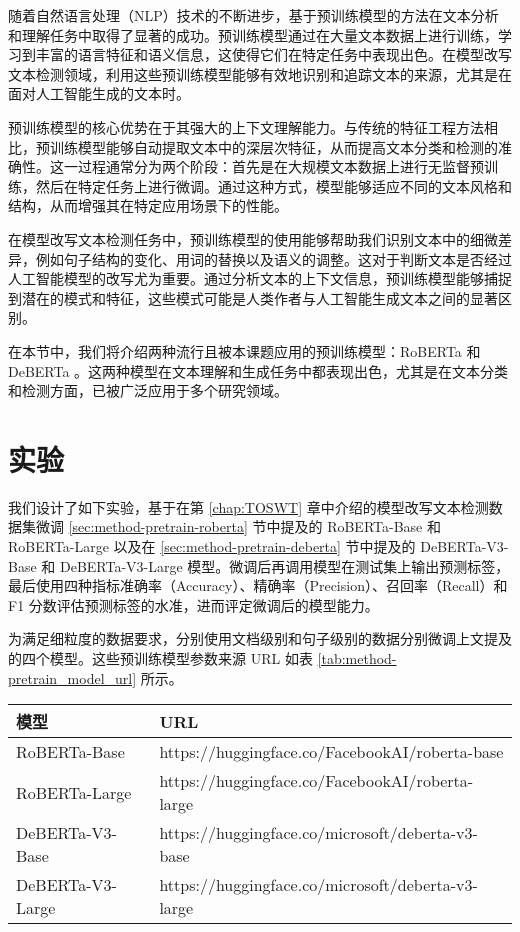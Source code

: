 随着自然语言处理（NLP）技术的不断进步，基于预训练模型的方法在文本分析和理解任务中取得了显著的成功。预训练模型通过在大量文本数据上进行训练，学习到丰富的语言特征和语义信息，这使得它们在特定任务中表现出色。在模型改写文本检测领域，利用这些预训练模型能够有效地识别和追踪文本的来源，尤其是在面对人工智能生成的文本时。

预训练模型的核心优势在于其强大的上下文理解能力。与传统的特征工程方法相比，预训练模型能够自动提取文本中的深层次特征，从而提高文本分类和检测的准确性。这一过程通常分为两个阶段：首先是在大规模文本数据上进行无监督预训练，然后在特定任务上进行微调。通过这种方式，模型能够适应不同的文本风格和结构，从而增强其在特定应用场景下的性能。

在模型改写文本检测任务中，预训练模型的使用能够帮助我们识别文本中的细微差异，例如句子结构的变化、用词的替换以及语义的调整。这对于判断文本是否经过人工智能模型的改写尤为重要。通过分析文本的上下文信息，预训练模型能够捕捉到潜在的模式和特征，这些模式可能是人类作者与人工智能生成文本之间的显著区别。

在本节中，我们将介绍两种流行且被本课题应用的预训练模型：RoBERTa \cite{liu_roberta_2019} 和 DeBERTa \cite{he_deberta_2021, he2023debertav3improvingdebertausing}。这两种模型在文本理解和生成任务中都表现出色，尤其是在文本分类和检测方面，已被广泛应用于多个研究领域。

\section{实验}
\label{sec:method-experiment}

我们设计了如下实验，基于在第 \ref{chap:TOSWT} 章中介绍的模型改写文本检测数据集微调 \ref{sec:method-pretrain-roberta} 节中提及的 RoBERTa-Base 和 RoBERTa-Large 以及在 \ref{sec:method-pretrain-deberta} 节中提及的 DeBERTa-V3-Base 和 DeBERTa-V3-Large 模型。微调后再调用模型在测试集上输出预测标签，最后使用四种指标准确率（Accuracy）、精确率（Precision）、召回率（Recall）和 F1 分数评估预测标签的水准，进而评定微调后的模型能力。

为满足细粒度的数据要求，分别使用文档级别和句子级别的数据分别微调上文提及的四个模型。这些预训练模型参数来源 URL 如表 \ref{tab:method-pretrain_model_url} 所示。

\begin{table*}[htbp]
\centering
\caption{预训练模型参数来源 URL} \label{tab:method-pretrain_model_url}
\begin{tabular}{ll}
\toprule
\textbf{模型}      & \textbf{URL}                                                                 \\ \midrule
RoBERTa-Base \cite{liu_roberta_2019}     & https://huggingface.co/FacebookAI/roberta-base    \\
RoBERTa-Large \cite{liu_roberta_2019}   & https://huggingface.co/FacebookAI/roberta-large   \\
DeBERTa-V3-Base \cite{he2023debertav3improvingdebertausing}  & https://huggingface.co/microsoft/deberta-v3-base  \\
DeBERTa-V3-Large \cite{he2023debertav3improvingdebertausing} & https://huggingface.co/microsoft/deberta-v3-large \\ \bottomrule
\end{tabular}
\end{table*}

